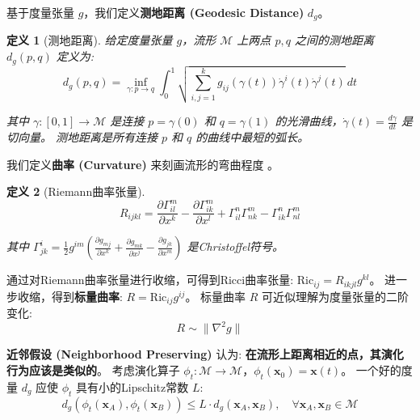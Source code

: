 \documentclass[12pt, a4paper]{article}
\newtheorem{definition}{定义}[section]
\newcommand{\manifold}{\mathcal{M}}
\newcommand{\metric}{g}
\newcommand{\fastvar}{\bm{x}}          %
\newcommand{\dyndist}{d}                %
\newcommand{\evolop}{\phi}              %
\begin{document}
基于度量张量 $\metric$，我们定义\textbf{测地距离 (Geodesic Distance)} $d_\metric$。

\begin{definition}[测地距离]
\label{def:geodesic_distance}
    给定度量张量 $\metric$，流形 $\manifold$ 上两点 $p, q$ 之间的测地距离 $d_\metric(p, q)$ 定义为:
    \begin{equation}
    \label{eq:geodesic_distance}
        d_\metric(p, q) = \inf_{\gamma: p \to q} \int_0^1 \sqrt{\sum_{i,j=1}^k \metric_{ij}(\gamma(t)) \dot{\gamma}^i(t) \dot{\gamma}^j(t)}\, dt
    \end{equation}

    其中 $\gamma: [0,1] \to \manifold$ 是连接 $p = \gamma(0)$ 和 $q = \gamma(1)$ 的光滑曲线，$\dot{\gamma}(t) = \frac{d\gamma}{dt}$ 是切向量。
    测地距离是所有连接 $p$ 和 $q$ 的曲线中最短的弧长。
\end{definition}

我们定义\textbf{曲率 (Curvature)} 来刻画流形的弯曲程度 \cite{lee2018introduction}。

\begin{definition}[Riemann曲率张量]
\label{def:riemann_curvature_tensor}
    \begin{equation}
    \label{eq:riemann_curvature_tensor}
        R_{ijkl} = \frac{\partial \Gamma_{il}^m}{\partial x^k} - \frac{\partial \Gamma_{ik}^m}{\partial x^l} + \Gamma_{il}^n\Gamma_{nk}^m - \Gamma_{ik}^n\Gamma_{nl}^m
    \end{equation}

    其中 $\Gamma_{jk}^i = \frac{1}{2}g^{im}(\frac{\partial g_{mj}}{\partial x^k} + \frac{\partial g_{mk}}{\partial x^j} - \frac{\partial g_{jk}}{\partial x^m})$ 是Christoffel符号。
\end{definition}

通过对Riemann曲率张量进行收缩，可得到Ricci曲率张量: $\mathrm{Ric}_{ij} = R_{ikjl}g^{kl}$。
进一步收缩，得到\textbf{标量曲率}: $R = \mathrm{Ric}_{ij}g^{ij}$。
标量曲率 $R$ 可近似理解为度量张量的二阶变化:
\begin{equation}
\label{eq:scalar_curvature_approximation}
    R \sim \|\nabla^2 g\|
\end{equation}

\textbf{近邻假设 (Neighborhood Preserving)} 认为: \textbf{在流形上距离相近的点，其演化行为应该是类似的}。
考虑演化算子 $\evolop_t: \manifold \to \manifold$，$\evolop_t(\fastvar_0) = \fastvar(t)$。
一个好的度量 $\dyndist_\metric$ 应使 $\evolop_t$ 具有小的Lipschitz常数 $L$:
\begin{equation}
\label{eq:neighborhood_preserving}
    \dyndist_\metric(\evolop_t(\fastvar_A), \evolop_t(\fastvar_B)) \leq L \cdot \dyndist_\metric(\fastvar_A, \fastvar_B), \quad \forall \fastvar_A, \fastvar_B \in \manifold
\end{equation}
\end{document}
